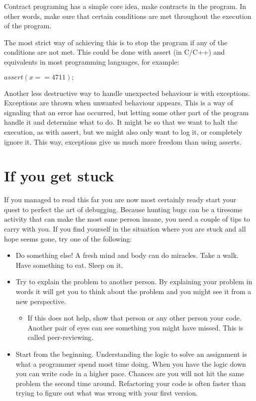 \documentclass[11pt,a4paper,twoside]{article}
\begin{document}
Contract programing has a simple core idea, make contracts in the program. In
other words, make sure that certain conditions are met throughout the execution
of the program.

The most strict way of achieving this is to stop the program if any of the
conditions are not met. This could be done with assert (in C/C++) and
equivalents in most programming languages, for example:

$assert(x == 4711);$

Another less destructive way to handle unexpected behaviour is with exceptions.
Exceptions are thrown when unwanted behaviour appears. This is a way of
signaling that an error has occurred, but letting some other part of the
program handle it and determine what to do. It might be so that we want to halt
the execution, as with assert, but we might also only want to log it, or
completely ignore it. This way, exceptions give us much more freedom than using
asserts.


\section{If you get stuck}

If you managed to read this far you are now most certainly ready start your
quest to perfect the art of debugging. Because hunting bugs can be a tiresome
activity that can make the most sane person insane, you need a couple of tips
to carry with you. If you find yourself in the situation where you are stuck
and all hope seems gone, try one of the following: 

\begin{itemize} 
    \item Do something else! A fresh mind and body can do miracles. Take a walk.
          Have something to eat. Sleep on it. 
    \item Try to explain the problem to another person. By explaining your 
          problem in words it will get you to think about the problem and you 
          might see it from a new perspective.  
    \begin{itemize}
        \item If this does not help, show that person or any other person
              your code. Another pair of eyes can see something you might have 
              missed. This is called peer-reviewing.
    \end{itemize}
    
    \item Start from the beginning. Understanding the logic to solve an 
          assignment is what a programmer spend most time doing. When you have
          the logic down you can write code in a higher pace. Chances are you
          will not hit the same problem the second time around. Refactoring your
          code is often faster than trying to figure out what was wrong with 
          your first version.
\end{itemize}
\end{document}

